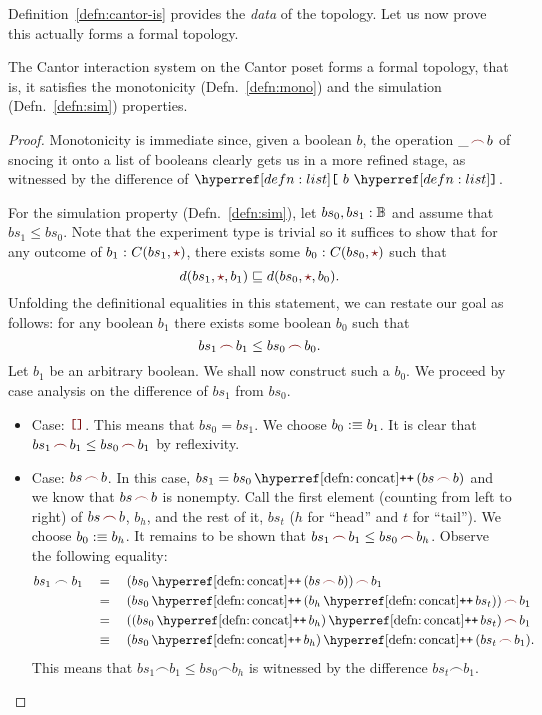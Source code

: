 Definition~\ref{defn:cantor-is} provides the \emph{data} of the topology. Let us now prove
this actually forms a formal topology.
\begin{thm}\label{thm:cantor-topo}
  The Cantor interaction system on the Cantor poset forms a formal topology, that is, it
  satisfies the monotonicity (Defn.~\ref{defn:mono}) and the simulation
  (Defn.~\ref{defn:sim}) properties.
\end{thm}
\begin{proof}
  Monotonicity is immediate since, given a boolean $b$, the operation $\snoc{\_}{b}$ of
  snocing it onto a list of booleans clearly gets us in a more refined stage, as witnessed
  by the difference of $\singleton{b}$.

  For the simulation property (Defn.~\ref{defn:sim}), let
  $bs_0, bs_1:\mathbb{B}{}$ and assume that $bs_1 \le bs_0$. Note that the
  experiment type is trivial so it suffices to show that for any outcome of
  $\oftyI{b_1}{C(bs_1, \unittm{})}$, there exists some $\oftyI{b_0}{C(bs_0, \unittm{})}$
  such that
  \begin{equation*}
    d(bs_1, \unittm{}, b_1) \sqsubseteq d(bs_0, \unittm{}, b_0).
  \end{equation*}
  Unfolding the definitional equalities in this statement, we can restate our goal as
  follows: for any boolean $b_1$ there exists some boolean $b_0$ such that
  \begin{equation*}
    \snoc{bs_1}{b_1} \le \snoc{bs_0}{b_0}.
  \end{equation*}
  Let $b_1$ be an arbitrary boolean. We shall now construct such a $b_0$. We proceed by
  case analysis on the difference of $bs_1$ from $bs_0$.
  \begin{itemize}
    \item Case: $\emptylist{}$. This means that $bs_0 = bs_1$. We choose $b_0 :\equiv b_1$. It
      is clear that $\snoc{bs_1}{b_1} \le \snoc{bs_0}{b_1}$ by reflexivity.
    \item Case: $\snoc{bs}{b}$. In this case, $bs_1 = bs_0 \concat{} (\snoc{bs}{b})$ and
      we know that $\snoc{bs}{b}$ is nonempty. Call the first element (counting from left
      to right) of $\snoc{bs}{b}$, $b_h$, and the rest of it, $bs_t$ ($h$ for ``head'' and
      $t$ for ``tail''). We choose $b_0 :\equiv b_h$. It remains to be shown that
      $\snoc{bs_1}{b_1} \le \snoc{bs_0}{b_h}$.
      Observe the following equality:
      \begin{align*}
        bs_1 \frown b_1 \quad&=\quad \snoc{(bs_0 \concat{} (\snoc{bs}{b}))}{b_1}       \\
                   \quad&=\quad \snoc{(bs_0 \concat{} (b_h \concat{} bs_t))}{b_1} \\
                   \quad&=\quad \snoc{((bs_0 \concat{} b_h) \concat{} bs_t)}{b_1} \\
                   \quad&\equiv\quad (bs_0 \concat{} b_h) \concat{} (\snoc{bs_t}{b_1}) .
      \end{align*}
      This means that $bs_1 \frown b_1 \le bs_0 \frown b_h$ is witnessed by the difference
      $bs_t \frown b_1$.
  \end{itemize}
\end{proof}

